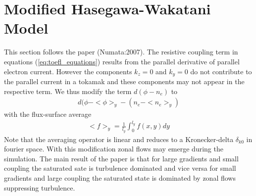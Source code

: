 \documentclass[a4paper,12pt]{scrartcl}
\begin{document}
\section{ Modified Hasegawa-Wakatani Model}
\label{seq:modified}
This section follows the paper (Numata:2007). The resistive coupling term
in equations (\ref{eq:toefl_equations}) results from the parallel 
derivative of parallel electron current. However the components 
$k_z=0$ and $k_y=0$ do not contribute to the parallel current in a tokamak
and 
these components may not appear in the respective term. 
We thus modify the term $d(\phi - n_e)$ to 
\begin{align}
d(\phi - <\phi>_y - (n_e - <n_e>_y)
\end{align}
with the flux-surface average
\begin{align}
 <f>_y = \frac{1}{l_y}\int_0^{l_y}f(x,y)dy
\end{align}
Note that the averaging operator is linear and reduces to a Kronecker-delta
 $\delta_{k0}$ in fourier space. With this modification zonal flows 
 may emerge during the simulation.
 The main result of the paper is that for large gradients and 
 small coupling the saturated sate is turbulence dominated and 
 vice versa for small gradients and large coupling the saturated state 
 is dominated by zonal flows suppressing turbulence.
\end{document}
